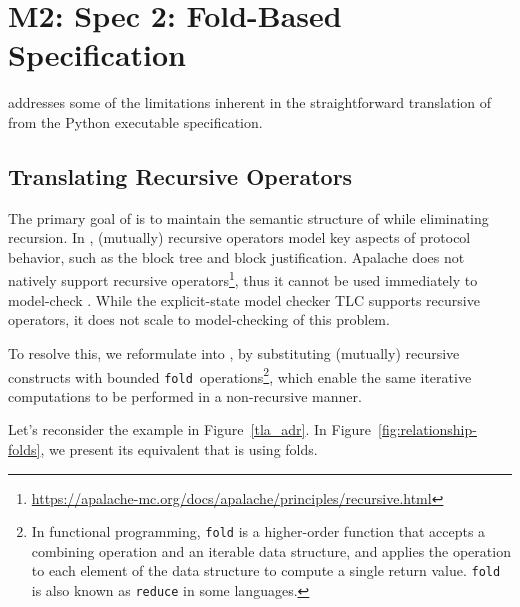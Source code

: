 
\section{M2: Spec 2: Fold-Based Specification}

\SpecTwo{} addresses some of the limitations inherent in the straightforward
translation of \SpecOne{} from the Python executable specification.

\subsection{Translating Recursive \tlap{} Operators}

The primary goal of \SpecTwo{} is to maintain the semantic structure of
\SpecOne{} while eliminating recursion. In \SpecOne{}, (mutually) recursive
operators model key aspects of protocol behavior, such as the block tree and
block justification. Apalache does not natively support recursive
operators\footnote{\url{https://apalache-mc.org/docs/apalache/principles/recursive.html}},
thus it cannot be used immediately to model-check \SpecOne{}. While the
explicit-state \tlap{} model checker TLC supports recursive operators, it does
not scale to model-checking of this problem.

To resolve this, we reformulate \SpecOne{} into \SpecTwo{}, by substituting
(mutually) recursive constructs with bounded
\texttt{fold}~operations\footnote{In functional programming, \texttt{fold} is a
higher-order function that accepts a combining operation and an iterable data
structure, and applies the operation to each element of the data structure
to compute a single return value. \texttt{fold} is also known as
\texttt{reduce} in some languages.}, which enable the same iterative
computations to be performed in a non-recursive manner.

Let's reconsider the example in Figure~\ref{tla_adr}. In
Figure~\ref{fig:relationship-folds}, we present its equivalent that is using
folds.


